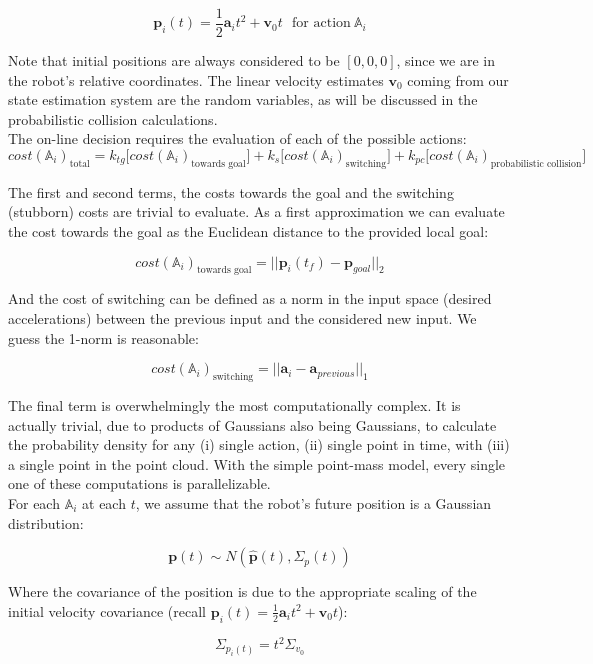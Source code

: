 \documentclass[paper=a4, fontsize=11pt]{scrartcl} %
\numberwithin{equation}{section} %
\numberwithin{figure}{section} %
\numberwithin{table}{section} %
\begin{document}
$$ \textbf{p}_i(t) = \frac{1}{2} \textbf{a}_i t^2 + \mathbf{v}_0 t \ \ \ \text{for action} \  \mathbb{A}_i$$

Note that initial positions are always considered to be $[0,0,0]$, since we are in the robot's relative coordinates.  The linear velocity estimates $\mathbf{v}_0$ coming from our state estimation system are the random variables, as will be discussed in the probabilistic collision calculations.\\

The on-line decision requires the evaluation of each of the possible actions:
$$ cost(\mathbb{A}_i)_{\text{total}} = k_{tg}\big[ cost(\mathbb{A}_i)_{\text{towards goal}}  \big]+  k_{s} \big[ cost(\mathbb{A}_i)_{\text{switching}} \big]+   k_{pc}\big[ cost(\mathbb{A}_i)_{\text{probabilistic collision}} \big] $$

The first and second terms, the costs towards the goal and the switching (stubborn) costs are trivial to evaluate.  As a first approximation we can evaluate the cost towards the goal as the Euclidean distance to the provided local goal:

$$cost(\mathbb{A}_i)_{\text{towards goal}} = || \mathbf{p}_i(t_f) - \mathbf{p}_{goal} ||_2 $$

And the cost of switching can be defined as a norm in the input space (desired accelerations) between the previous input and the considered new input.  We guess the 1-norm is reasonable:

$$cost(\mathbb{A}_i)_{\text{switching}} = || \textbf{a}_i - \textbf{a}_{previous} ||_1 $$

The final term is overwhelmingly the most computationally complex.  It is actually trivial, due to products of Gaussians also being Gaussians, to calculate the probability density for any (i) single action, (ii) single point in time, with (iii) a single point in the point cloud.  With the simple point-mass model, every single one of these computations is parallelizable.\\

For each $\mathbb{A}_i$ at each $t$, we assume that the robot's future position is a Gaussian distribution: 

$$\mathbf{p}(t) \sim N(\mathbf{\hat{p}}(t), \Sigma_p(t))$$

Where the covariance of the position is due to the appropriate scaling of the initial velocity covariance (recall $ \textbf{p}_i(t) = \frac{1}{2} \textbf{a}_i t^2 + \mathbf{v}_0 t$):

$$ \Sigma_{p_i(t)} = t^2 \Sigma_{v_0}$$
\end{document}
